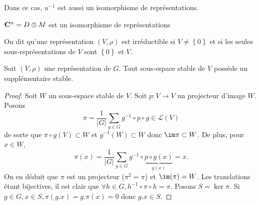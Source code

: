 \begin{rem}
Dans ce cas, $u^{-1}$ est aussi un isomorphisme de représentations.
\end{rem}

\begin{ex}
$ \mathbf C^n=D\oplus M$ est un isomorphisme de représentations
\end{ex}

\begin{dfn}
    On dit qu'une représentation $(V, \rho)$ est irréductible si $V\neq \left\{ 0 \right\} $ et si les seules sous-représentations de $V$ sont  $\left\{ 0 \right\} $ et $V$.
\end{dfn}

\begin{thm}
    Soit $(V, \rho)$ une représentation de  $G$. Tout sous-espace stable de  $V$ possède un supplémentaire stable.
\end{thm}

\begin{proof}
Soit $W$ un sous-espace stable de $V$. Soit $p : V \longrightarrow  V$ un projecteur d'image $W$. Posons \[
    \pi=\frac1{|G|}\sum_{g \in  G}g^{-1}\circ p \circ g \in  \mathcal  L(V)
\] 
de sorte que $\pi\circ g(V)\subset W$ et  $g^{-1}(W)\subset W$ donc $\im \pi\subset W$. De plus, pour  $x \in  W$, \[
    \pi(x)=\frac1{|G|}\sum_{g \in  G}g^{-1} \circ \underbrace{p\circ g(x)}_{g(x)}=x.
\]
On en déduit que $\pi$ est un projecteur ($\pi^2=\pi$) et $\im(\pi)=W$.
Les translations étant bijectives, il est clair que  $\forall  h \in  G, h^{-1}\circ \pi\circ h=\pi$. Posons $S=\ker \pi $. Si  $g \in  G, x \in  S, \pi(g.x)=g.\pi(x)=0$ donc $g.x \in  S$.
\end{proof}
